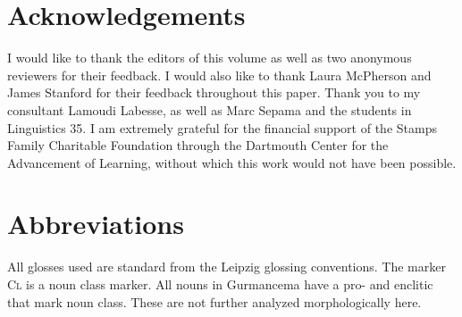 \documentclass[output=paper,newtxmath,modfonts,nonflat,draftmode]{langsci/langscibook}
\begin{document}
\section*{Acknowledgements}

I would like to thank the editors of this volume as well as two anonymous reviewers for their feedback. I would also like to thank Laura McPherson and James Stanford for their feedback throughout this paper. Thank you to my consultant Lamoudi Labesse, as well as Marc Sepama and the 
students in Linguistics 35. I am extremely grateful for the financial support of the Stamps Family Charitable Foundation through the Dartmouth Center for the Advancement of 
Learning, without which this work would not have been possible. 

\section*{Abbreviations}
All glosses used are standard from the Leipzig glossing conventions. The marker \textsc{Cl} is a noun class marker. All nouns in Gurmancema have a 
pro- and enclitic that mark noun class. These are not further analyzed morphologically here. 



{\sloppy
\printbibliography[heading=subbibliography,notkeyword=this] 
}
\end{document}
